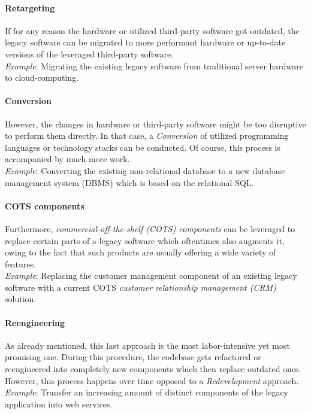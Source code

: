 \documentclass[12pt,a4paper]{report}
\begin{document}
\paragraph{Retargeting}
If for any reason the hardware or utilized third-party software got outdated,
the legacy software can be migrated to more performant hardware or
up-to-date versions of the leveraged third-party software.\\
\textit{Example}: Migrating the existing legacy software from traditional server
hardware to cloud-computing.

\paragraph{Conversion}
However, the changes in hardware or third-party software might be too disruptive
to perform them directly. In that case, a \textit{Conversion} of utilized
programming languages or technology stacks can be conducted.
Of course, this process is accompanied by much more work.\\
\textit{Example}: Converting the existing non-relational database to a
new database management system (DBMS) which is based on the relational SQL.

\paragraph{COTS components}
Furthermore, \textit{commercial-off-the-shelf (COTS) components} can be
leveraged to replace certain parts of a legacy software which oftentimes also
augments it, owing to the fact that such products are usually offering a wide
variety of features.\\
\textit{Example}: Replacing the customer management component of an existing
legacy software with a current COTS \textit{customer relationship management (CRM)} solution.

\paragraph{Reengineering}
As already mentioned, this last approach is the most labor-intensive yet most promising one.
During this procedure, the codebase gets refactored or reengineered
into completely new components which then replace outdated ones.
However, this process happens over time opposed to a \textit{Redevelopment} approach.\\
\textit{Example}: Transfer an increasing amount of distinct components
of the legacy application into web services.
\end{document}
